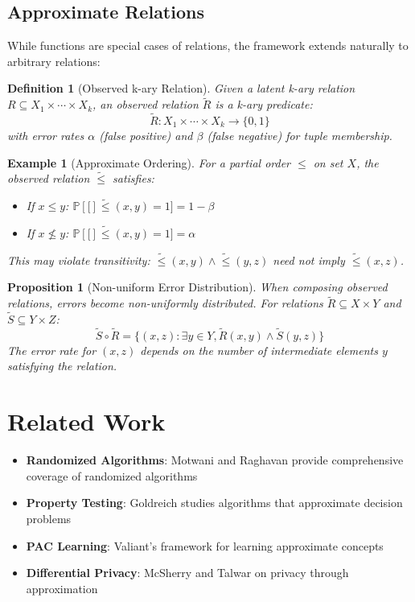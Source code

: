 \documentclass[11pt,final,hidelinks]{article}
\newtheorem{proposition}[theorem]{Proposition}
\newtheorem{definition}[theorem]{Definition}
\newtheorem{example}[theorem]{Example}
\newcommand{\obs}[1]{\widetilde{#1}}  %
\newcommand{\Prob}[1]{\mathbb{P}\left[#1\right]}
\begin{document}
\subsection{Approximate Relations}

While functions are special cases of relations, the framework extends naturally to arbitrary relations:

\begin{definition}[Observed k-ary Relation]
Given a latent k-ary relation $R \subseteq X_1 \times \cdots \times X_k$, an observed relation $\obs{R}$ is a k-ary predicate:
\begin{equation}
\obs{R}: X_1 \times \cdots \times X_k \to \{0,1\}
\end{equation}
with error rates $\alpha$ (false positive) and $\beta$ (false negative) for tuple membership.
\end{definition}

\begin{example}[Approximate Ordering]
For a partial order $\leq$ on set $X$, the observed relation $\obs{\leq}$ satisfies:
\begin{itemize}
    \item If $x \leq y$: $\Prob[\obs{\leq}(x,y) = 1] = 1 - \beta$
    \item If $x \not\leq y$: $\Prob[\obs{\leq}(x,y) = 1] = \alpha$
\end{itemize}
This may violate transitivity: $\obs{\leq}(x,y) \land \obs{\leq}(y,z)$ need not imply $\obs{\leq}(x,z)$.
\end{example}

\begin{proposition}[Non-uniform Error Distribution]
When composing observed relations, errors become non-uniformly distributed. For relations $\obs{R} \subseteq X \times Y$ and $\obs{S} \subseteq Y \times Z$:
\begin{equation}
\obs{S} \circ \obs{R} = \{(x,z) : \exists y \in Y, \obs{R}(x,y) \land \obs{S}(y,z)\}
\end{equation}
The error rate for $(x,z)$ depends on the number of intermediate elements $y$ satisfying the relation.
\end{proposition}

\section{Related Work}

\begin{itemize}
    \item \textbf{Randomized Algorithms}: Motwani and Raghavan \cite{motwani1995} provide comprehensive coverage of randomized algorithms
    \item \textbf{Property Testing}: Goldreich \cite{goldreich2017} studies algorithms that approximate decision problems
    \item \textbf{PAC Learning}: Valiant's framework \cite{valiant1984} for learning approximate concepts
    \item \textbf{Differential Privacy}: McSherry and Talwar \cite{mcsherry2007} on privacy through approximation
\end{itemize}
\end{document}
